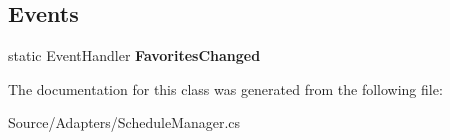 \subsection*{Events}
\begin{DoxyCompactItemize}
\item 
static Event\+Handler {\bfseries Favorites\+Changed}\hypertarget{class_w_c_c_mobile_1_1_schedule_manager_ae50ee038373a79b31fccc2885901d39f}{}\label{class_w_c_c_mobile_1_1_schedule_manager_ae50ee038373a79b31fccc2885901d39f}

\end{DoxyCompactItemize}


The documentation for this class was generated from the following file\+:\begin{DoxyCompactItemize}
\item 
Source/\+Adapters/Schedule\+Manager.\+cs\end{DoxyCompactItemize}
